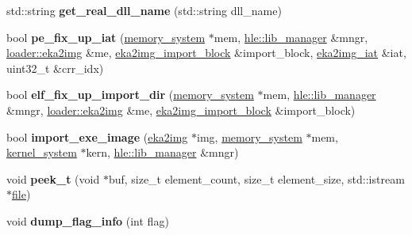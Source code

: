 \begin{DoxyCompactItemize}
std\+::string {\bfseries get\+\_\+real\+\_\+dll\+\_\+name} (std\+::string dll\+\_\+name)
\item 
\mbox{\label{namespaceeka2l1_1_1loader_abf005e25291b02adedc60c86811f93f3}} 
bool {\bfseries pe\+\_\+fix\+\_\+up\+\_\+iat} (\mbox{\hyperlink{classeka2l1_1_1memory__system}{memory\+\_\+system}} $\ast$mem, \mbox{\hyperlink{classeka2l1_1_1hle_1_1lib__manager}{hle\+::lib\+\_\+manager}} \&mngr, \mbox{\hyperlink{structeka2l1_1_1loader_1_1eka2img}{loader\+::eka2img}} \&me, \mbox{\hyperlink{structeka2l1_1_1loader_1_1eka2img__import__block}{eka2img\+\_\+import\+\_\+block}} \&import\+\_\+block, \mbox{\hyperlink{structeka2l1_1_1loader_1_1eka2img__iat}{eka2img\+\_\+iat}} \&iat, uint32\+\_\+t \&crr\+\_\+idx)
\item 
\mbox{\label{namespaceeka2l1_1_1loader_a0fe9f8d199df282327cfa3a92b37f9eb}} 
bool {\bfseries elf\+\_\+fix\+\_\+up\+\_\+import\+\_\+dir} (\mbox{\hyperlink{classeka2l1_1_1memory__system}{memory\+\_\+system}} $\ast$mem, \mbox{\hyperlink{classeka2l1_1_1hle_1_1lib__manager}{hle\+::lib\+\_\+manager}} \&mngr, \mbox{\hyperlink{structeka2l1_1_1loader_1_1eka2img}{loader\+::eka2img}} \&me, \mbox{\hyperlink{structeka2l1_1_1loader_1_1eka2img__import__block}{eka2img\+\_\+import\+\_\+block}} \&import\+\_\+block)
\item 
\mbox{\label{namespaceeka2l1_1_1loader_a1de938d322b843c307f970204dca395d}} 
bool {\bfseries import\+\_\+exe\+\_\+image} (\mbox{\hyperlink{structeka2l1_1_1loader_1_1eka2img}{eka2img}} $\ast$img, \mbox{\hyperlink{classeka2l1_1_1memory__system}{memory\+\_\+system}} $\ast$mem, \mbox{\hyperlink{classeka2l1_1_1kernel__system}{kernel\+\_\+system}} $\ast$kern, \mbox{\hyperlink{classeka2l1_1_1hle_1_1lib__manager}{hle\+::lib\+\_\+manager}} \&mngr)
\item 
\mbox{\label{namespaceeka2l1_1_1loader_aa7df7a35015a6870a5643c1eedd9d646}} 
void {\bfseries peek\+\_\+t} (void $\ast$buf, size\+\_\+t element\+\_\+count, size\+\_\+t element\+\_\+size, std\+::istream $\ast$\mbox{\hyperlink{structeka2l1_1_1file}{file}})
\item 
\mbox{\label{namespaceeka2l1_1_1loader_a0cf197f214efa8bbc36f3811e3fe41a7}} 
void {\bfseries dump\+\_\+flag\+\_\+info} (int flag)

\end{DoxyCompactItemize}
